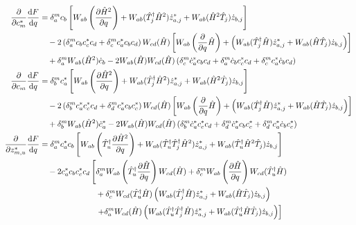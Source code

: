\documentclass[12pt]{article}
\newcommand{\hc}{^\dagger}
\begin{document}
	\begin{align}
	\pdv{c_m^*}\dv{F}{q} &= \delta^m_a c_b \left[  W_{ab}\left(\pdv{\hat{H}^2}{q}\right) + W_{ab}(\hat{T}_j\hc \hat{H}^2) \dot{z}_{a,j}^* + W_{ab}(\hat{H}^2 \hat{T}_j) \dot{z}_{b,j}\right] \nonumber\\
	&\quad -2 \left( \delta^m_a c_b c_c^* c_d + \delta^m_c c_a^* c_b c_d \right) W_{cd}(\hat{H}) \left[ W_{ab}\left(\pdv{q}\hat{H}\right) + \left( W_{ab}(\hat{T}_j\hc \hat{H}) \dot{z}_{a,j}^* + W_{ab}(\hat{H} \hat{T}_j) \dot{z}_{b,j} \right) \right] \nonumber\\
	&\quad + \delta^m_a W_{ab}(\hat{H}^2) \dot{c}_b - 2 W_{ab}(\hat{H}) W_{cd}(\hat{H}) \left(\delta^m_c \dot{c}_a^* c_b c_d + \delta^m_a \dot{c}_b c_c^* c_d + \delta^m_c c_a^* \dot{c}_b c_d \right)\\
	\pdv{c_m}\dv{F}{q} &= \delta^m_b c_a^* \left[  W_{ab}\left(\pdv{\hat{H}^2}{q}\right) + W_{ab}(\hat{T}_j\hc \hat{H}^2) \dot{z}_{a,j}^* + W_{ab}(\hat{H}^2 \hat{T}_j) \dot{z}_{b,j}\right] \nonumber\\
	&\quad -2 \left( \delta^m_b c_a^* c_c^* c_d + \delta^m_d c_a^* c_b c_c^* \right) W_{cd}(\hat{H}) \left[ W_{ab}\left(\pdv{q}\hat{H}\right) + \left( W_{ab}(\hat{T}_j\hc \hat{H}) \dot{z}_{a,j}^* + W_{ab}(\hat{H} \hat{T}_j) \dot{z}_{b,j} \right) \right] \nonumber\\
	&\quad + \delta^m_b W_{ab}(\hat{H}^2) \dot{c}_a^* - 2 W_{ab}(\hat{H}) W_{cd}(\hat{H}) \left( \delta^m_b \dot{c}_a^* c_c^* c_d + \delta^m_d \dot{c}_a^* c_b c_c^* + \delta^m_d c_a^* \dot{c}_b c_c^* \right)\\
	\pdv{z_{m,u}^*}\dv{F}{q} &= \delta_a^m c_a^* c_b \left[  W_{ab}\left(\hat{T}_u\hc\pdv{\hat{H}^2}{q}\right) + W_{ab}(\hat{T}_u\hc\hat{T}_j\hc \hat{H}^2) \dot{z}_{a,j}^* + W_{ab}(\hat{T}_u\hc\hat{H}^2 \hat{T}_j) \dot{z}_{b,j}\right] \nonumber\\
	&\quad -2 c_a^* c_b c_c^* c_d \left[ \delta_a^m W_{ab}\left(\hat{T}_u\hc \pdv{\hat{H}}{q}\right) W_{cd}(\hat{H}) + \delta_c^m W_{ab}\left(\pdv{\hat{H}}{q}\right) W_{cd}(\hat{T}_u\hc\hat{H}) \right.\nonumber\\
	&\qquad\qquad\qquad\quad + \delta_c^m W_{cd}(\hat{T}_u\hc\hat{H}) \left( W_{ab}(\hat{T}_j\hc \hat{H}) \dot{z}_{a,j}^* + W_{ab}(\hat{H} \hat{T}_j) \dot{z}_{b,j} \right) \nonumber\\
	&\qquad\qquad\qquad\quad \left.+ \delta_a^m W_{cd}(\hat{H}) \left( W_{ab}(\hat{T}_u\hc\hat{T}_j\hc \hat{H}) \dot{z}_{a,j}^* + W_{ab}(\hat{T}_u\hc\hat{H} \hat{T}_j) \dot{z}_{b,j} \right) \right] \nonumber\\

\end{align}
\end{document}
